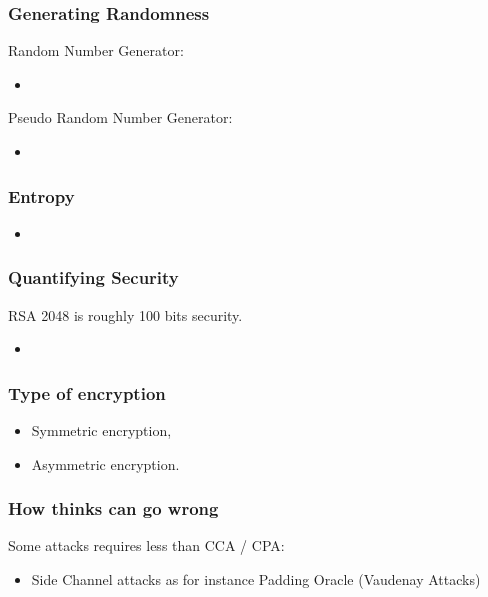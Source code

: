 \documentclass{beamer}
\begin{document}
\begin{frame}
        \frametitle{Generating Randomness}

        Random Number Generator:
        \begin{itemize}
          \item
        \end{itemize}

        Pseudo Random Number Generator:
        \begin{itemize}
          \item
        \end{itemize}

\end{frame}


\begin{frame}
        \frametitle{Entropy}

        \begin{itemize}
          \item
        \end{itemize}

\end{frame}

\begin{frame}
        \frametitle{Quantifying Security}
       RSA 2048 is roughly 100 bits security. 
        \begin{itemize}
          \item 
        \end{itemize}

\end{frame}


\begin{frame}
        \frametitle{Type of encryption}

        \begin{itemize}
          \item Symmetric encryption,
          \item Asymmetric encryption.
        \end{itemize}

\end{frame}


\begin{frame}
        \frametitle{How thinks can go wrong}
        Some attacks requires less than CCA / CPA:
        \begin{itemize}
          \item Side Channel attacks as for instance Padding Oracle (Vaudenay Attacks)
        \end{itemize}

\end{frame}
\end{document}
